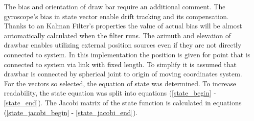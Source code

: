 The bias and orientation of draw bar require an additional comment. The gyroscope's bias in state vector enable drift tracking and its compensation. Thanks to an Kalman Filter's properties the value of actual bias will be almost automatically calculated when the filter runs. The azimuth and elevation of drawbar enables utilizing external position sources even if they are not directly connected to system. In this implementation the position is given for point that is connected to system via link with fixed length. To simplify it is assumed that drawbar is connected by spherical joint to origin of moving coordinates system. For the vectors so selected, the equation of state was determined. To increase readability, the state equation was split into equations (\ref{state_begin} - \ref{state_end}). The Jacobi matrix of the state function is calculated in equations (\ref{state_jacobi_begin} - \ref{state_jacobi_end}).

